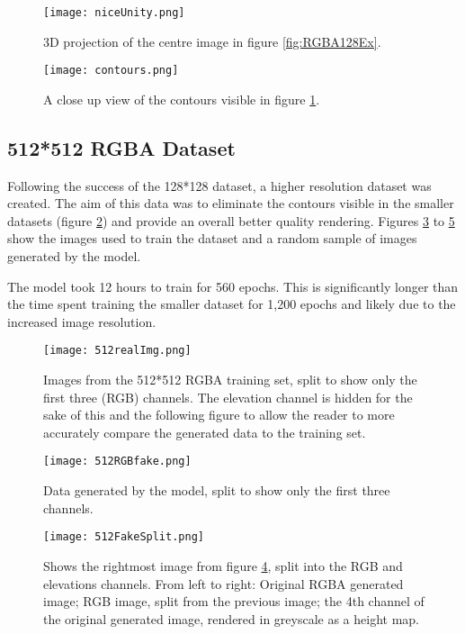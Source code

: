 \documentclass[a4paper]{report}
\begin{document}
\begin{figure}[H]
    \centering
        \texttt{[image: niceUnity.png]}
        \caption{3D projection of the centre image in figure \ref{fig:RGBA128Ex}.}
        \label{fig:niceUnity}
\end{figure}

\begin{figure}[H]
    \centering
        \texttt{[image: contours.png]}
        \caption{A close up view of the contours visible in figure \ref{fig:niceUnity}.}
        \label{fig:contours}
\end{figure}

\subsection{512*512 RGBA Dataset}

Following the success of the 128*128 dataset, a higher resolution dataset was created. The aim of this data was to eliminate the contours visible in the smaller datasets (figure \ref{fig:contours}) and provide an overall better quality rendering. Figures \ref{fig:512Real} to \ref{fig:split} show the images used to train the dataset and a random sample of images generated by the model.

The model took 12 hours to train for 560 epochs. This is significantly longer than the time spent training the smaller dataset for 1,200 epochs and likely due to the increased image resolution.

\begin{figure}[H]
    \centering
        \texttt{[image: 512realImg.png]}
        \caption{Images from the 512*512 RGBA training set, split to show only the first three (RGB) channels. The elevation channel is hidden for the sake of this and the following figure to allow the reader to more accurately compare the generated data to the training set.}
        \label{fig:512Real}
\end{figure}

\begin{figure}[H]
    \centering
        \texttt{[image: 512RGBfake.png]}
        \caption{Data generated by the model, split to show only the first three channels.}
        \label{fig:512Fake}
\end{figure}

\begin{figure}[H]
    \centering
        \texttt{[image: 512FakeSplit.png]}
        \caption{Shows the rightmost image from figure \ref{fig:512Fake}, split into the RGB and elevations channels. From left to right: Original RGBA generated image; RGB image, split from the previous image; the 4th channel of the original generated image, rendered in greyscale as a height map.}
        \label{fig:split}
\end{figure}
\end{document}
